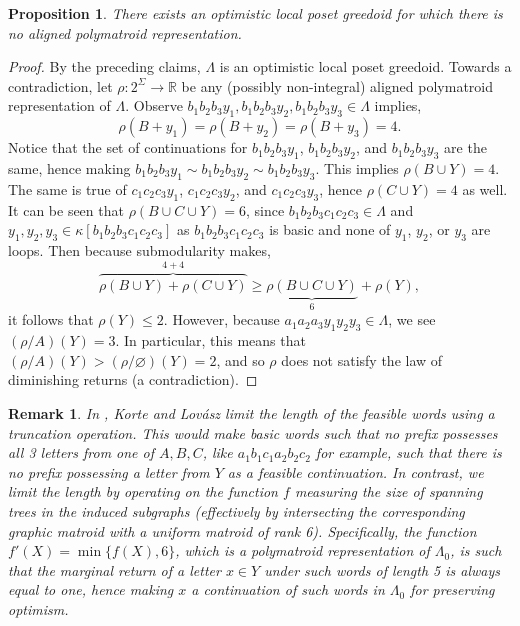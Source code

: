 \documentclass[11pt]{article}
\newtheorem{proposition}[theorem]{Proposition}
\newtheorem{remark}[theorem]{Remark}
\newcommand{\univ}{\Sigma}
\newcommand{\glang}{\Lambda}
\begin{document}
\begin{proposition}
    There exists an optimistic local poset greedoid for which there is no aligned polymatroid representation.
\end{proposition}
\begin{proof}
    By the preceding claims, $\glang$ is an optimistic local poset greedoid.
    Towards a contradiction, let $\rho:2^\univ\to\mathbb{R}$ be any (possibly non-integral) aligned polymatroid representation of $\glang$.
    Observe $b_1b_2b_3y_1, b_1b_2b_3y_2, b_1b_2b_3y_3 \in \glang$ implies,
    $$\rho(B+ y_1) = \rho(B+y_2) = \rho(B+y_3) =4.$$
    Notice that the set of continuations for $b_1b_2b_3y_1$, $b_1b_2b_3y_2$, and $b_1b_2b_3y_3$ are the same, hence making $b_1b_2b_3y_1 \sim b_1b_2b_3y_2 \sim b_1b_2b_3y_3$.
    This implies $\rho(B\cup Y) = 4$.%
    The same is true of $c_1c_2c_3y_1$, $c_1c_2c_3y_2$, and $c_1c_2c_3y_3$, hence $\rho(C\cup Y) = 4$ as well.
    It can be seen that $\rho(B\cup C\cup Y) = 6$, since $b_1b_2b_3c_1c_2c_3 \in \glang$ and $y_1,y_2,y_3 \in \kappa[b_1b_2b_3c_1c_2c_3]$ as $b_1b_2b_3c_1c_2c_3$ is basic and none of $y_1$, $y_2$, or $y_3$ are loops.
    Then because submodularity makes,
    \begin{equation*}
    \overbrace{\rho(B\cup Y) + \rho(C\cup Y)}^{4+4}\geq \underbrace{\rho(B\cup C\cup Y)}_{6} + \rho(Y),
    \end{equation*}
    it follows that $\rho(Y) \leq 2$.
    However, because $a_1a_2a_3y_1y_2y_3 \in \glang$, we see $(\rho/A)(Y) = 3$.
    In particular, this means that $(\rho/A)(Y) > (\rho/\varnothing)(Y) = 2$, and so $\rho$ does not satisfy the law of diminishing returns (a contradiction).
\end{proof}

\begin{remark}\label{rem:change}
    In \cite{korte1988intersection}, Korte and Lovász limit the length of the feasible words using a truncation operation.
    This would make basic words such that no prefix possesses all 3 letters from one of $A, B, C$, like $a_1b_1c_1a_2b_2c_2$ for example, such that there is no prefix possessing a letter from $Y$ as a feasible continuation.
    In contrast, we limit the length by operating on the function $f$ measuring the size of spanning trees in the induced subgraphs (effectively by intersecting the corresponding graphic matroid with a \emph{uniform matroid} of rank 6).
    Specifically, the function $f'(X) = \min\{f(X), 6\}$, which is a polymatroid representation of $\glang_0$, is such that the marginal return of a letter $x \in Y$ under such words of length 5 is always equal to one, hence making $x$ a continuation of such words in $\glang_0$ for preserving optimism.
\end{remark}
\end{document}
